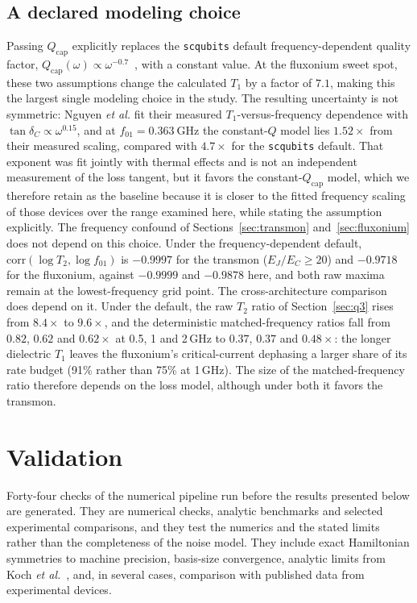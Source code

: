 \documentclass{SciPost}
\begin{document}
\subsection{A declared modeling choice}
\label{sec:model-choice}

Passing $Q_{\mathrm{cap}}$ explicitly replaces the \texttt{scqubits} default frequency-dependent
quality factor, $Q_{\mathrm{cap}}(\omega)\propto\omega^{-0.7}$~\cite{smith2020}, with a constant
value. At the fluxonium sweet spot, these two assumptions change the calculated $T_1$ by a factor
of $7.1$, making this the largest single modeling choice in the study. The resulting uncertainty
is not symmetric: Nguyen \emph{et al.} fit their measured $T_1$-versus-frequency dependence with
$\tan\delta_C\propto\omega^{0.15}$, and at $f_{01}=\SI{0.363}{\giga\hertz}$ the constant-$Q$ model
lies $1.52\times$ from their measured scaling, compared with $4.7\times$ for the \texttt{scqubits}
default. That exponent was fit jointly with thermal effects and is not an independent measurement
of the loss tangent, but it favors the constant-$Q_{\mathrm{cap}}$ model, which we therefore retain as the baseline because it is closer to the fitted frequency scaling of
those devices over the range examined here, while stating the assumption explicitly. The frequency confound of Sections~\ref{sec:transmon} and~\ref{sec:fluxonium} does
not depend on this choice. Under the frequency-dependent default,
$\mathrm{corr}(\log T_2,\log f_{01})$ is $-0.9997$ for the transmon ($E_J/E_C\ge20$) and $-0.9718$
for the fluxonium, against $-0.9999$ and $-0.9878$ here, and both raw maxima remain at the
lowest-frequency grid point. The cross-architecture comparison does depend on it. Under the
default, the raw $T_2$ ratio of Section~\ref{sec:q3} rises from $8.4\times$ to $9.6\times$, and
the deterministic matched-frequency ratios fall from $0.82$, $0.62$ and $0.62\times$ at 0.5, 1 and
2\,GHz to $0.37$, $0.37$ and $0.48\times$: the longer dielectric $T_1$ leaves the fluxonium's
critical-current dephasing a larger share of its rate budget (91\% rather than 75\% at 1\,GHz). The
size of the matched-frequency ratio therefore depends on the loss model, although under both it
favors the transmon.

\section{Validation}
\label{sec:validation}

Forty-four checks of the numerical pipeline run before the results presented below are generated.
They are numerical checks, analytic benchmarks and selected experimental comparisons, and they test
the numerics and the stated limits rather than the completeness of the noise model. They include exact Hamiltonian symmetries to machine precision, basis-size
convergence, analytic limits from Koch \emph{et al.}~\cite{koch2007}, and, in several cases,
comparison with published data from experimental devices.
\end{document}

